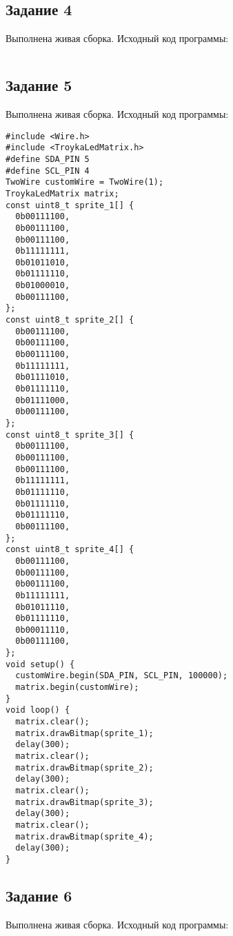 \documentclass[a4paper,14pt]{extarticle}
\begin{document}
  \subsection*{\hspace{12.5mm}Задание 4}
  Выполнена живая сборка. Исходный код программы:

  \begingroup
    \fontsize{14pt}{10pt}\selectfont
    \linespread{1}
    \begin{verbatim}
    \end{verbatim}
  \endgroup

  \subsection*{\hspace{12.5mm}Задание 5}
  Выполнена живая сборка. Исходный код программы:

  \begingroup
    \fontsize{14pt}{10pt}\selectfont
    \linespread{1}
    \begin{verbatim}
#include <Wire.h>
#include <TroykaLedMatrix.h>
#define SDA_PIN 5
#define SCL_PIN 4
TwoWire customWire = TwoWire(1);
TroykaLedMatrix matrix;
const uint8_t sprite_1[] {
  0b00111100,
  0b00111100,
  0b00111100,
  0b11111111,
  0b01011010,
  0b01111110,
  0b01000010,
  0b00111100,
};
const uint8_t sprite_2[] {
  0b00111100,
  0b00111100,
  0b00111100,
  0b11111111,
  0b01111010,
  0b01111110,
  0b01111000,
  0b00111100,
};
const uint8_t sprite_3[] {
  0b00111100,
  0b00111100,
  0b00111100,
  0b11111111,
  0b01111110,
  0b01111110,
  0b01111110,
  0b00111100,
};
const uint8_t sprite_4[] {
  0b00111100,
  0b00111100,
  0b00111100,
  0b11111111,
  0b01011110,
  0b01111110,
  0b00011110,
  0b00111100,
};
void setup() {
  customWire.begin(SDA_PIN, SCL_PIN, 100000);
  matrix.begin(customWire);
}
void loop() {
  matrix.clear();
  matrix.drawBitmap(sprite_1);
  delay(300);
  matrix.clear();
  matrix.drawBitmap(sprite_2);
  delay(300);
  matrix.clear();
  matrix.drawBitmap(sprite_3);
  delay(300);
  matrix.clear();
  matrix.drawBitmap(sprite_4);
  delay(300);
}
    \end{verbatim}
  \endgroup

  \subsection*{\hspace{12.5mm}Задание 6}
  Выполнена живая сборка. Исходный код программы:
\end{document}
